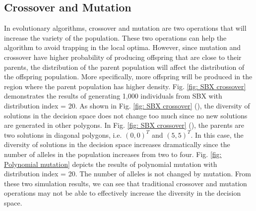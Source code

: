 \documentclass[conference]{IEEEtran}
\begin{document}
\subsection{Crossover and Mutation}
In evolutionary algorithms, crossover and mutation are two operations that will increase the variety of the population. These two operations can help the algorithm to avoid trapping in the local optima. However, since mutation and crossover have higher probability of producing offspring that are close to their parents, the distribution of the parent population will affect the distribution of the offspring population. More specifically, more offspring will be produced in the region where the parent population has higher density. Fig. \ref{fig: SBX crossover} demonstrates the results of generating 1,000 individuals from SBX\cite{SBX} with distribution index = 20. As shown in Fig. \ref{fig: SBX crossover} (), the diversity of solutions in the decision space does not change too much since no new solutions are generated in other polygons. In Fig. \ref{fig: SBX crossover} (), the parents are two solutions in diagonal polygons, i.e. $(0, 0)^T$ and $(5, 5)^T$. In this case, the diversity of solutions in the decision space increases dramatically since the number of alleles in the population increases from two to four. Fig. \ref{fig: Polynomial mutation} depicts the results of polynomial mutation with distribution index = 20. The number of alleles is not changed by mutation. From these two simulation results, we can see that traditional crossover and mutation operations may not be able to effectively increase the diversity in the decision space.
\end{document}

